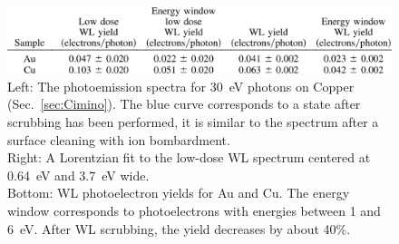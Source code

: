 \begin{figure}[tbh]
\begin{minipage}[c]{0.7\textwidth}
        \includegraphics[width=\textwidth]{../ss/cimino_table.png}
    \end{minipage}
    \caption{
        Left: The photoemission spectra for 30~eV photons on Copper (Sec.~\ref{sec:Cimino}).
        The blue curve corresponds to a state after scrubbing has been performed, it is similar to the spectrum after a surface cleaning with ion bombardment.
        \\
        Right: A Lorentzian fit to the low-dose WL spectrum centered at 0.64~eV and 3.7~eV wide.
        \\
        Bottom: WL photoelectron yields for Au and Cu.
        The energy window corresponds to photoelectrons with energies between 1 and 6~eV.
        After WL scrubbing, the yield decreases by about 40\%.
		}
    \label{fig:cimino_cu_spectrum}
\end{figure}

